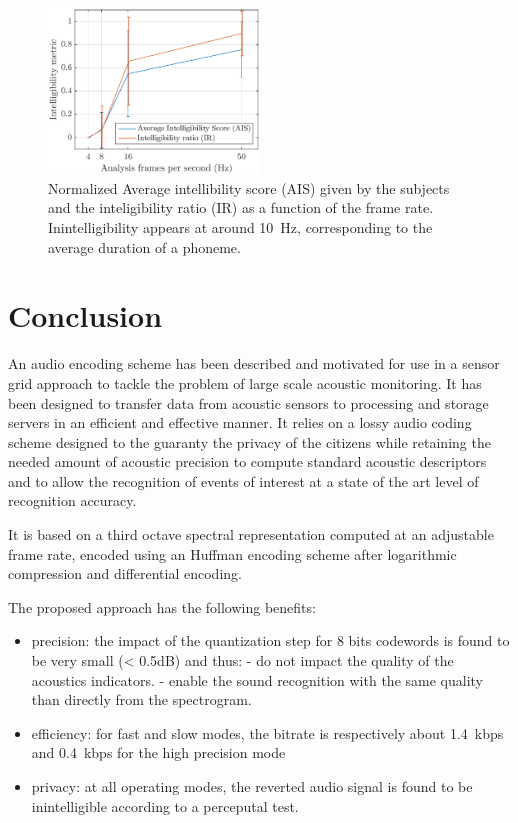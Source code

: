 \documentclass[sensors,article,submit,moreauthors,pdftex,10pt,a4paper]{mdpi}
\begin{document}
\begin{figure}[htbp]
	\centering
		\includegraphics[width=0.5\textwidth]{figures/subj_int.eps}
	\caption{Normalized Average intellibility score (AIS) given by the subjects and the inteligibility ratio (IR) as a function of the frame rate. Inintelligibility appears at around 10~Hz, corresponding to the average duration of a phoneme.}
	\label{fig:subj_int}
\end{figure}

\section{Conclusion}

An audio encoding scheme has been described and motivated for use in a sensor grid approach to tackle the problem of large scale acoustic monitoring. It has been designed to transfer data from acoustic sensors to processing and storage servers in an efficient and effective manner. It relies on a lossy audio coding scheme designed to the guaranty the privacy of the citizens while retaining the needed amount of acoustic precision to compute standard acoustic descriptors and to allow the recognition of events of interest at a state of the art level of recognition accuracy.

It is based on a third octave spectral representation computed at an adjustable frame rate, encoded using an Huffman encoding scheme after logarithmic compression and differential encoding.

The proposed approach has the following benefits:
\begin{itemize}
	\item precision: the impact of the quantization step for 8 bits codewords is found to be very small (< 0.5dB) and thus:
	- do not impact the quality of the acoustics indicators.
	- enable the sound recognition with the same quality than directly from the spectrogram.
	\item efficiency: for fast and slow modes, the bitrate is respectively about 1.4~kbps and 0.4~kbps for the high precision mode
	\item privacy: at all operating modes, the reverted audio signal is found to be inintelligible according to a perceputal test.
\end{itemize}
\end{document}
